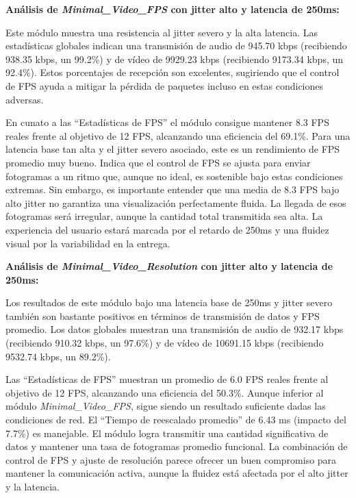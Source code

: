 \vspace{\baselineskip}

\textbf{Análisis de \textit{Minimal\_Video\_FPS} con jitter alto y latencia de 250ms:}
\vspace{\baselineskip}

Este módulo muestra una resistencia al jitter severo y la alta latencia. Las estadísticas globales indican una transmisión de audio de 945.70 kbps (recibiendo 938.35 kbps, un 99.2\%) y de vídeo de 9929.23 kbps (recibiendo 9173.34 kbps, un 92.4\%). Estos porcentajes de recepción son excelentes, sugiriendo que el control de FPS ayuda a mitigar la pérdida de paquetes incluso en estas condiciones adversas.
\vspace{\baselineskip}

En cunato a las ``Estadísticas de FPS'' el módulo consigue mantener 8.3 FPS reales frente al objetivo de 12 FPS, alcanzando una eficiencia del 69.1\%. Para una latencia base tan alta y el jitter severo asociado, este es un rendimiento de FPS promedio muy bueno. Indica que el control de FPS se ajusta para enviar fotogramas a un ritmo que, aunque no ideal, es sostenible bajo estas condiciones extremas. Sin embargo, es importante entender que una media de 8.3 FPS bajo alto jitter no garantiza una visualización perfectamente fluida. La llegada de esos fotogramas será irregular, aunque la cantidad total transmitida sea alta. La experiencia del usuario estará marcada por el retardo de 250ms y una fluidez visual por la variabilidad en la entrega.

\vspace{\baselineskip}

\textbf{Análisis de \textit{Minimal\_Video\_Resolution} con jitter alto y latencia de 250ms:}
\vspace{\baselineskip}

Los resultados de este módulo bajo una latencia base de 250ms y jitter severo también son bastante positivos en términos de transmisión de datos y FPS promedio. Los datos globales muestran una transmisión de audio de 932.17 kbps (recibiendo 910.32 kbps, un 97.6\%) y de vídeo de 10691.15 kbps (recibiendo 9532.74 kbps, un 89.2\%).
\vspace{\baselineskip}

Las ``Estadísticas de FPS'' muestran un promedio de 6.0 FPS reales frente al objetivo de 12 FPS, alcanzando una eficiencia del 50.3\%. Aunque inferior al módulo \textit{Minimal\_Video\_FPS}, sigue siendo un resultado suficiente dadas las condiciones de red. El ``Tiempo de reescalado promedio'' de 6.43 ms (impacto del 7.7\%) es manejable. El módulo logra transmitir una cantidad significativa de datos y mantener una tasa de fotogramas promedio funcional. La combinación de control de FPS y ajuste de resolución parece ofrecer un buen compromiso para mantener la comunicación activa, aunque la fluidez está afectada por el alto jitter y la latencia.

